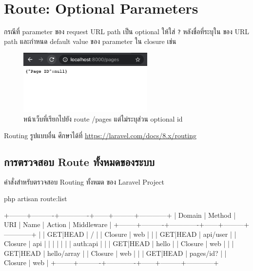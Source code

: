 \section{Route: Optional Parameters}

กรณีที่ parameter ของ request URL path เป็น optional ให้ใส่ \texttt{?} หลังชื่อที่ระบุใน \texttt{{}} 
ของ URL path และกำหนด default value ของ parameter ใน closure เช่น


\newpage

\begin{figure}[h!]
    \centering
    \includegraphics[width=0.6\textwidth]{images/ch3/07.png}
    \caption{หน้าเว็บที่เรียกไปยัง route /pages แต่ไม่ระบุส่วน optional id}
\end{figure}

Routing รูปแบบอื่น ศึกษาได้ที่ \href{https://laravel.com/docs/8.x/routing}{https://laravel.com/docs/8.x/routing}

\subsection{การตรวจสอบ Route ทั้งหมดของระบบ}

คำสั่งสำหรับตรวจสอบ Routing ทั้งหมด ของ Laravel Project

\begin{cli}{}
    php artisan route:list
\end{cli}

\begin{out}{}
+--------+----------+-------------+------+---------+------------+
| Domain | Method   | URI         | Name | Action  | Middleware |
+--------+----------+-------------+------+---------+------------+
|        | GET|HEAD | /           |      | Closure | web        |
|        | GET|HEAD | api/user    |      | Closure | api        |
|        |          |             |      |         | auth:api   |
|        | GET|HEAD | hello       |      | Closure | web        |
|        | GET|HEAD | hello/array |      | Closure | web        |
|        | GET|HEAD | pages/{id?} |      | Closure | web        |
+--------+----------+-------------+------+---------+------------+
\end{out}